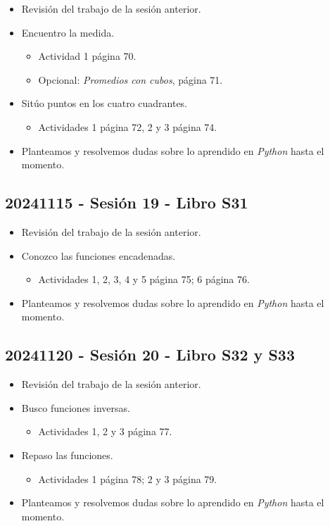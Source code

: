 \documentclass[a4paper,12pt]{article}
\begin{document}
\begin{itemize}
    \item Revisión del trabajo de la sesión anterior.
    \item Encuentro la medida.
    \begin{itemize}
        \item Actividad 1 página 70.
        \item Opcional: \textit{Promedios con cubos}, página 71.
    \end{itemize}
    \item Sitúo puntos en los cuatro cuadrantes.
    \begin{itemize}
        \item Actividades 1 página 72, 2 y 3 página 74.
    \end{itemize}
    \item Planteamos y resolvemos dudas sobre lo aprendido en \textit{Python} hasta el momento.
\end{itemize}

\subsection{20241115 - Sesión 19 - Libro S31}

\begin{itemize}
    \item Revisión del trabajo de la sesión anterior.
    \item Conozco las funciones encadenadas.
    \begin{itemize}
        \item Actividades 1, 2, 3, 4 y 5 página 75; 6 página 76.
    \end{itemize}
    \item Planteamos y resolvemos dudas sobre lo aprendido en \textit{Python} hasta el momento.
\end{itemize}

\subsection{20241120 - Sesión 20 - Libro S32 y S33}

\begin{itemize}
    \item Revisión del trabajo de la sesión anterior.
    \item Busco funciones inversas.
    \begin{itemize}
        \item Actividades 1, 2 y 3 página 77.
    \end{itemize}
    \item Repaso las funciones.
    \begin{itemize}
        \item Actividades 1 página 78; 2 y 3 página 79.
    \end{itemize}
    \item Planteamos y resolvemos dudas sobre lo aprendido en \textit{Python} hasta el momento.
\end{itemize}
\end{document}
